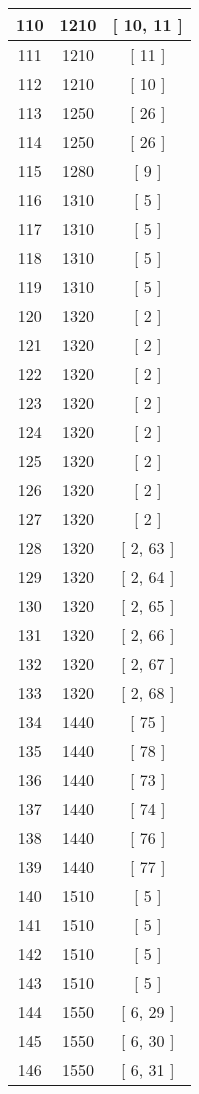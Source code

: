 \begin{center}
\begin{longtable}[H]{|| c c c ||}
\hline
110 & 1210 & [ 10, 11 ] \\ 
\hline
111 & 1210 & [ 11 ] \\ 
\hline
112 & 1210 & [ 10 ] \\ 
\hline
113 & 1250 & [ 26 ] \\ 
\hline
114 & 1250 & [ 26 ] \\ 
\hline
115 & 1280 & [ 9 ] \\ 
\hline
116 & 1310 & [ 5 ] \\ 
\hline
117 & 1310 & [ 5 ] \\ 
\hline
118 & 1310 & [ 5 ] \\ 
\hline
119 & 1310 & [ 5 ] \\ 
\hline
120 & 1320 & [ 2 ] \\ 
\hline
121 & 1320 & [ 2 ] \\ 
\hline
122 & 1320 & [ 2 ] \\ 
\hline
123 & 1320 & [ 2 ] \\ 
\hline
124 & 1320 & [ 2 ] \\ 
\hline
125 & 1320 & [ 2 ] \\ 
\hline
126 & 1320 & [ 2 ] \\ 
\hline
127 & 1320 & [ 2 ] \\ 
\hline
128 & 1320 & [ 2, 63 ] \\ 
\hline
129 & 1320 & [ 2, 64 ] \\ 
\hline
130 & 1320 & [ 2, 65 ] \\ 
\hline
131 & 1320 & [ 2, 66 ] \\ 
\hline
132 & 1320 & [ 2, 67 ] \\ 
\hline
133 & 1320 & [ 2, 68 ] \\ 
\hline
134 & 1440 & [ 75 ] \\ 
\hline
135 & 1440 & [ 78 ] \\ 
\hline
136 & 1440 & [ 73 ] \\ 
\hline
137 & 1440 & [ 74 ] \\ 
\hline
138 & 1440 & [ 76 ] \\ 
\hline
139 & 1440 & [ 77 ] \\ 
\hline
140 & 1510 & [ 5 ] \\ 
\hline
141 & 1510 & [ 5 ] \\ 
\hline
142 & 1510 & [ 5 ] \\ 
\hline
143 & 1510 & [ 5 ] \\ 
\hline
144 & 1550 & [ 6, 29 ] \\ 
\hline
145 & 1550 & [ 6, 30 ] \\ 
\hline
146 & 1550 & [ 6, 31 ] \\ 

\end{longtable}
\end{center}
